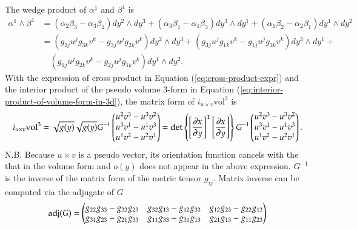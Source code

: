 \documentclass[11pt, a4paper]{book}
\begin{document}
\begin{enumerate}
\begin{itemize}
\begin{Proof}
      The wedge product of $\alpha^1$ and $\beta^1$ is
      \begin{align*}
        \alpha^1 \wedge \beta^1
        &= (\alpha_2\beta_3 - \alpha_3\beta_2) dy^2 \wedge dy^3 +
          (\alpha_3\beta_1 - \alpha_1\beta_3) dy^3 \wedge dy^1 + (\alpha_1\beta_2 -
          \alpha_2\beta_1) dy^1 \wedge dy^2 \\
        &= (g_{2j}u^j g_{3k}v^k - g_{3j}u^j g_{2k}v^k) dy^2 \wedge dy^3 + (g_{3j}u^j
          g_{1k}v^k - g_{1j}u^j g_{3k}v^k) dy^3 \wedge dy^1 + \\
        &\quad (g_{1j}u^j g_{2k}v^k - g_{2j}u^j g_{1k}v^k) dy^1 \wedge dy^2.
      \end{align*}
      With the expression of cross product in Equation (\ref{eq:cross-product-expr}) and
      the interior product of the pseudo volume 3-form in Equation
      (\ref{eq:interior-product-of-volume-form-in-3d}), the matrix form of
      $i_{u\times v} \mathrm{vol}^3$ is
      \begin{equation*}
        i_{u\times v} \mathrm{vol}^3 = \sqrt{g(y)} \sqrt{g(y)} G^{-1} \begin{pmatrix}
          u^2v^3-u^3v^2 \\
          u^3v^1-u^1v^3 \\
          u^1v^2-u^2v^1
        \end{pmatrix} = \det\left\{\left[ \frac{\partial x}{\partial y} \right]^{\mathrm{T}} \left[
            \frac{\partial x}{\partial y} \right]\right\} G^{-1} \begin{pmatrix}
          u^2v^3-u^3v^2 \\
          u^3v^1-u^1v^3 \\
          u^1v^2-u^2v^1
        \end{pmatrix}.
      \end{equation*}
      N.B. Because $u\times v$ is a pseudo vector, its orientation function cancels with
      the that in the volume form and $o(y)$ does not appear in the above expression.
      $G^{-1}$ is the inverse of the matrix form of the metric tensor $g_{ij}$. Matrix
      inverse can be computed via the adjugate of $G$
      \begin{equation*}
        \operatorname{adj}(G) = \begin{pmatrix}
          g_{22}g_{33} - g_{32}g_{23} & g_{32}g_{13} - g_{12}g_{33} & g_{12}g_{23} -
          g_{22}g_{13} \\
          g_{31}g_{23} - g_{21}g_{33} & g_{11}g_{33} - g_{31}g_{13} & g_{21}g_{13} -
          g_{11}g_{23} \\

\end{pmatrix}
\end{equation*}
\end{Proof}
\end{itemize}
\end{enumerate}
\end{document}
